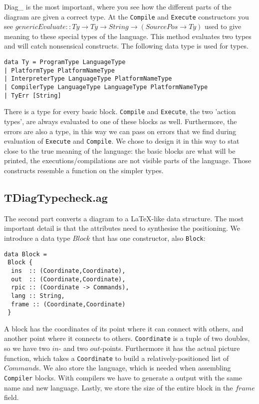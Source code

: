 \documentclass[10pt,a4paper,onecolumn]{article}
\begin{document}
		Diag\_ is the most important, where you see how the different parts of the diagram are given a correct type.
		At the \texttt{Compile} and \texttt{Execute} constructors you see $ genericEvaluate :: Ty \rightarrow Ty \rightarrow String \rightarrow (SourcePos \rightarrow Ty) $ used to give meaning to these special types of the language.
		This method evaluates two types and will catch nonsensical constructs.
		The following data type is used for types.

\begin{lstlisting}
data Ty = ProgramType LanguageType
| PlatformType PlatformNameType 
| InterpreterType LanguageType PlatformNameType 
| CompilerType LanguageType LanguageType PlatformNameType
| TyErr [String]
\end{lstlisting}

		There is a type for every basic block. \texttt{Compile} and \texttt{Execute}, the two 'action types', are always evaluated to one of these blocks as well.
		Furthermore, the errors are also a type, in this way we can pass on errors that we find during evaluation of \texttt{Execute} and \texttt{Compile}.
		We chose to design it in this way to stat  close to the true meaning of the language: the basic blocks are what will be printed, the executions/compilations are not visible parts of the language.
		Those constructs resemble a function on the simpler types.

		\subsection{TDiagTypecheck.ag}
		The second part converts a diagram to a LaTeX-like data structure.
		The most important detail is that the attributes need to synthesise the positioning.
		We introduce a data type $ Block $ that has one constructor, also \texttt{Block}:
		
\begin{lstlisting}
data Block = 
 Block {
  ins  :: (Coordinate,Coordinate),
  out  :: (Coordinate,Coordinate),
  rpic :: (Coordinate -> Commands),
  lang :: String,
  frame :: (Coordinate,Coordinate)
 }
\end{lstlisting}

		A block has the coordinates of its point where it can connect with others, and another point where it connects to others.
		\texttt{Coordinate} is a tuple of two doubles, so we have two $ in $- and two $ out $-points.
		Furthermore it has the actual picture function, which takes a \texttt{Coordinate} to build a relatively-positioned list of $ Command $s.
		We also store the language, which is needed when assembling \texttt{Compiler} blocks.
		With compilers we have to generate a output with the same name and new language.
		Lastly, we store the size of the entire block in the $ frame $ field.
\end{document}
